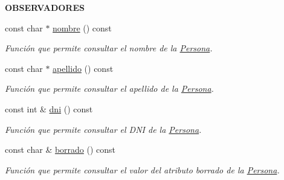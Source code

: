 \begin{Indent}{\bf O\+B\+S\+E\+R\+V\+A\+D\+O\+R\+E\+S}\par
\begin{DoxyCompactItemize}
\item 
const char $\ast$ \hyperlink{classedi_1_1Persona_acc287b52f557e4ae3a6041afef0ca141}{nombre} () const 
\begin{DoxyCompactList}\small\item\em Función que permite consultar el nombre de la \hyperlink{classedi_1_1Persona}{Persona}. \end{DoxyCompactList}\item 
const char $\ast$ \hyperlink{classedi_1_1Persona_a4d00212fe6e99c3864368a207a191767}{apellido} () const 
\begin{DoxyCompactList}\small\item\em Función que permite consultar el apellido de la \hyperlink{classedi_1_1Persona}{Persona}. \end{DoxyCompactList}\item 
const int \& \hyperlink{classedi_1_1Persona_a76626aaa10e27c4f860a450d78d96e18}{dni} () const 
\begin{DoxyCompactList}\small\item\em Función que permite consultar el D\+N\+I de la \hyperlink{classedi_1_1Persona}{Persona}. \end{DoxyCompactList}\item 
const char \& \hyperlink{classedi_1_1Persona_a3acfc3e07ec3dd168cfc2329a7ada7e4}{borrado} () const 
\begin{DoxyCompactList}\small\item\em Función que permite consultar el valor del atributo borrado de la \hyperlink{classedi_1_1Persona}{Persona}. \end{DoxyCompactList}\end{DoxyCompactItemize}
\end{Indent}
